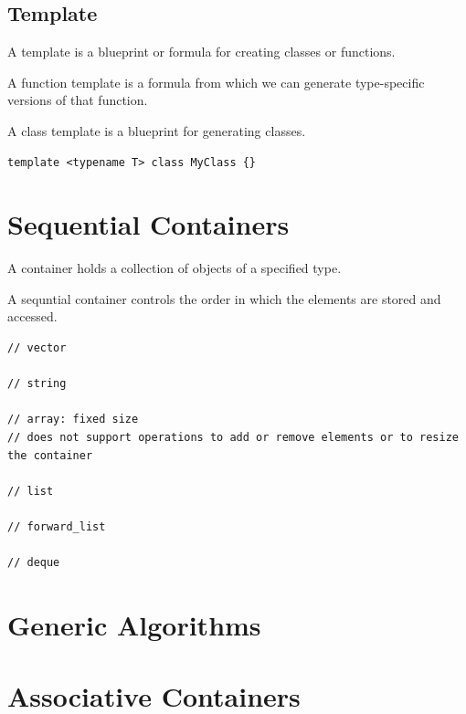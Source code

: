 \documentclass{blog}
\begin{document}
\subsection{Template}
\begin{definition}[template]
    A template is a blueprint or formula for creating classes or functions.
\end{definition}

\begin{definition}
    A function template is a formula from which we can generate type-specific versions of that function.
\end{definition}

\begin{definition}
    A class template is a blueprint for generating classes.
    \begin{verbatim}
template <typename T> class MyClass {}
\end{verbatim}
\end{definition}

\section{Sequential Containers}
\begin{definition}[container]
    A container holds a collection of objects of a specified type.
\end{definition}

\begin{definition}
    A sequntial container controls the order in which the elements are stored and accessed.
    \begin{verbatim}
// vector

// string

// array: fixed size
// does not support operations to add or remove elements or to resize the container

// list

// forward_list

// deque
\end{verbatim}
\end{definition}

\section{Generic Algorithms}

\section{Associative Containers}
\end{document}
